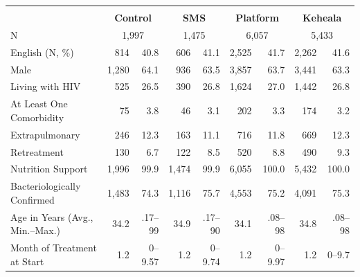 \scriptsize{\begin{tabular}{lrr|rr|rr|rr}
\hline \hline & & & & & & & & \\[-8pt]
\rowcolor{yellow!15}	& \multicolumn{2}{c|}{\textbf{Control}} & \multicolumn{2}{c|}{\textbf{SMS}} & \multicolumn{2}{c|}{\textbf{Platform}} & \multicolumn{2}{c}{\textbf{Keheala}}	 \\ \hline
N & \multicolumn{2}{c|}{1,997} & \multicolumn{2}{c|}{1,475} & \multicolumn{2}{c|}{6,057} & \multicolumn{2}{c}{5,433}    \\
English (N, \%) & 814 & 40.8 & 606 & 41.1 & 2,525 & 41.7 & 2,262 & 41.6  \\
Male & 1,280 & 64.1 & 936 & 63.5 & 3,857 & 63.7 & 3,441 & 63.3  \\
Living with HIV & 525 & 26.5 & 390 & 26.8 & 1,624 & 27.0 & 1,442 & 26.8  \\
At Least One Comorbidity & 75 & 3.8 & 46 & 3.1 & 202 & 3.3 & 174 & 3.2  \\
Extrapulmonary & 246 & 12.3 & 163 & 11.1 & 716 & 11.8 & 669 & 12.3  \\
Retreatment & 130 & 6.7 & 122 & 8.5 & 520 & 8.8 & 490 & 9.3  \\
Nutrition Support & 1,996 & 99.9 & 1,474 & 99.9 & 6,055 & 100.0 & 5,432 & 100.0  \\
Bacteriologically Confirmed & 1,483 & 74.3 & 1,116 & 75.7 & 4,553 & 75.2 & 4,091 & 75.3  \\
Age in Years (Avg., Min.--Max.) & 34.2 & .17--99 & 34.9 & .17--90 & 34.1 & .08--98 & 34.8 & .08--98  \\
Month of Treatment at Start & 1.2 & 0--9.57 & 1.2 & 0--9.74 & 1.2 & 0--9.97 & 1.2 & 0--9.7  \\
\hline \hline
\end{tabular}}